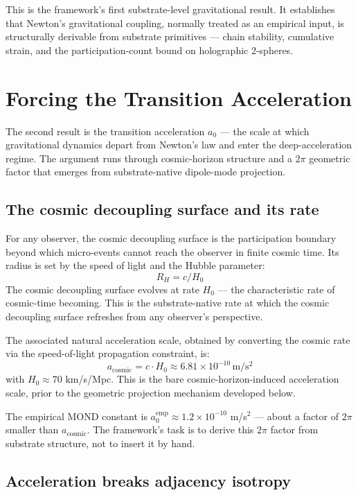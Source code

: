 \documentclass[11pt,a4paper]{article}
\begin{document}
This is the framework's first substrate-level gravitational result. It establishes that Newton's gravitational coupling, normally treated as an empirical input, is structurally derivable from substrate primitives --- chain stability, cumulative strain, and the participation-count bound on holographic 2-spheres.

\section{Forcing the Transition Acceleration}

The second result is the transition acceleration $a_0$ --- the scale at which gravitational dynamics depart from Newton's law and enter the deep-acceleration regime. The argument runs through cosmic-horizon structure and a $2\pi$ geometric factor that emerges from substrate-native dipole-mode projection.

\subsection{The cosmic decoupling surface and its rate}

For any observer, the cosmic decoupling surface is the participation boundary beyond which micro-events cannot reach the observer in finite cosmic time. Its radius is set by the speed of light and the Hubble parameter:
\[
R_H = c / H_{0}
\]
The cosmic decoupling surface evolves at rate $H_0$ --- the characteristic rate of cosmic-time becoming. This is the substrate-native rate at which the cosmic decoupling surface refreshes from any observer's perspective.

The associated natural acceleration scale, obtained by converting the cosmic rate via the speed-of-light propagation constraint, is:
\[
a_{\mathrm{cosmic}} = c \cdot H_{0} \approx 6.81 \times 10^{-10}\, \mathrm{m/s^2}
\]
with $H_0 \approx 70$ km/s/Mpc. This is the bare cosmic-horizon-induced acceleration scale, prior to the geometric projection mechanism developed below.

The empirical MOND constant is $a_0^{\mathrm{emp}} \approx 1.2 \times 10^{-10}$ m/s$^2$ --- about a factor of $2\pi$ smaller than $a_{\mathrm{cosmic}}$. The framework's task is to derive this $2\pi$ factor from substrate structure, not to insert it by hand.

\subsection{Acceleration breaks adjacency isotropy}
\end{document}
